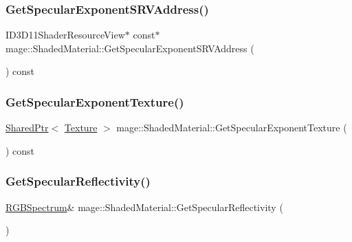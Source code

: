 \subsubsection{\texorpdfstring{Get\+Specular\+Exponent\+S\+R\+V\+Address()}{GetSpecularExponentSRVAddress()}}
{\footnotesize\ttfamily I\+D3\+D11\+Shader\+Resource\+View$\ast$ const$\ast$ mage\+::\+Shaded\+Material\+::\+Get\+Specular\+Exponent\+S\+R\+V\+Address (\begin{DoxyParamCaption}{ }\end{DoxyParamCaption}) const\hspace{0.3cm}{\ttfamily [noexcept]}}

\hypertarget{structmage_1_1_shaded_material_a0d1d76e70949caf33e30aa474882b364}{}\label{structmage_1_1_shaded_material_a0d1d76e70949caf33e30aa474882b364} 
\subsubsection{\texorpdfstring{Get\+Specular\+Exponent\+Texture()}{GetSpecularExponentTexture()}}
{\footnotesize\ttfamily \hyperlink{namespacemage_a1e01ae66713838a7a67d30e44c67703e}{Shared\+Ptr}$<$ \hyperlink{classmage_1_1_texture}{Texture} $>$ mage\+::\+Shaded\+Material\+::\+Get\+Specular\+Exponent\+Texture (\begin{DoxyParamCaption}{ }\end{DoxyParamCaption}) const\hspace{0.3cm}{\ttfamily [noexcept]}}

\hypertarget{structmage_1_1_shaded_material_aa13cf6b1af3568471ebd0f93a0bc08ac}{}\label{structmage_1_1_shaded_material_aa13cf6b1af3568471ebd0f93a0bc08ac} 
\subsubsection{\texorpdfstring{Get\+Specular\+Reflectivity()}{GetSpecularReflectivity()}\hspace{0.1cm}{\footnotesize\ttfamily [1/2]}}
{\footnotesize\ttfamily \hyperlink{structmage_1_1_r_g_b_spectrum}{R\+G\+B\+Spectrum}\& mage\+::\+Shaded\+Material\+::\+Get\+Specular\+Reflectivity (\begin{DoxyParamCaption}{ }\end{DoxyParamCaption})\hspace{0.3cm}{\ttfamily [noexcept]}}

